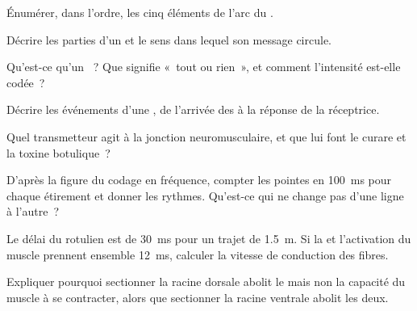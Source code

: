 \begin{exercise}[$\star$]\label{exo:g12:stretch-reflex:1}
Énumérer, dans l'ordre, les cinq éléments de l'arc du .
\end{exercise}

\begin{exercise}[$\star$]\label{exo:g12:stretch-reflex:2}
Décrire les parties d'un  et le sens dans lequel son message
circule.
\end{exercise}

\begin{exercise}[$\star$]\label{exo:g12:stretch-reflex:3}
Qu'est-ce qu'un ~? Que signifie «~tout ou rien~», et
comment l'intensité est-elle codée~?
\end{exercise}

\begin{exercise}[$\star$]\label{exo:g12:stretch-reflex:4}
Décrire les événements d'une , de l'arrivée des  à la réponse de la  réceptrice.
\end{exercise}

\begin{exercise}[$\star$]\label{exo:g12:stretch-reflex:5}
Quel transmetteur agit à la jonction neuromusculaire, et que lui font
le curare et la toxine botulique~?
\end{exercise}

\begin{exercise}[$\star\star$]\label{exo:g12:stretch-reflex:6}
D'après la figure du codage en fréquence, compter les pointes en
\qty{100}{ms} pour chaque étirement et donner les rythmes. Qu'est-ce
qui ne change pas d'une ligne à l'autre~?
\end{exercise}

\begin{exercise}[$\star\star$]\label{exo:g12:stretch-reflex:7}
Le délai du  rotulien est de \qty{30}{ms} pour un trajet de
\qty{1.5}{m}. Si la  et l'activation du muscle prennent
ensemble \qty{12}{ms}, calculer la vitesse de conduction des fibres.
\end{exercise}

\begin{exercise}[$\star\star$]\label{exo:g12:stretch-reflex:8}
Expliquer pourquoi sectionner la racine dorsale abolit le  mais
non la capacité du muscle à se contracter, alors que sectionner la
racine ventrale abolit les deux.
\end{exercise}

